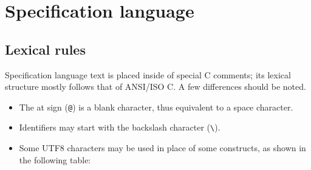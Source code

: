 
\chapter{Specification language}
\label{chap:base}

\section{Lexical rules}

Specification language text is placed inside of special C comments; 
its lexical structure mostly follows that of ANSI/ISO C. A few differences
should be noted.
\begin{itemize}
\item The at sign (\verb|@|) is a blank character, thus equivalent
  to a space character.
\item Identifiers may start with the backslash character (\verb|\|).
\item Some UTF8 characters may be used in place of some constructs, as
  shown in the following table:


\end{itemize}
